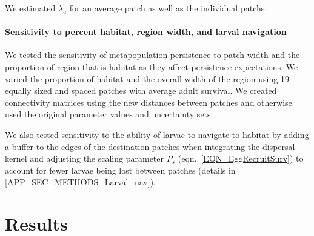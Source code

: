\documentclass[12pt, oneside]{article}   	%
\begin{document}
We estimated $\lambda_a$ for an average patch as well as the individual patchs. %


\paragraph*{Sensitivity to percent habitat, region width, and larval navigation}

We tested the sensitivity of metapopulation persistence to patch width and the proportion of region that is habitat as they affect persistence expectations. We varied the proportion of habitat and the overall width of the region using 19 equally sized and spaced patches with average adult survival. We created connectivity matrices using the new distances between patches and otherwise used the original parameter values and uncertainty sets. 

We also tested sensitivity to the ability of larvae to navigate to habitat by adding a buffer to the edges of the destination patches when integrating the dispersal kernel and adjusting the scaling parameter $P_s$ (eqn.\ \ref{EQN_EggRecruitSurv}) to account for fewer larvae being lost between patches (details in \ref{APP_SEC_METHODS_Larval_nav}).

\section*{Results}  

\end{document}
